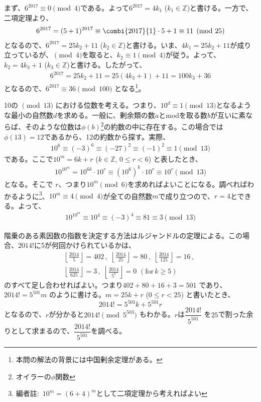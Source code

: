まず、$6^{2017}\equiv 0 \pmod{4}$である。よって$6^{2017}=4k_1$ ($k_1\in \mathbb{Z}$)と書ける。一方で、二項定理より、
\begin{align*}
 6^{2017}=(5+1)^{2017}\equiv \combi{2017}{1}\cdot 5 + 1 \equiv 11 \pmod{25}
\end{align*}
となるので、$6^{2017}=25k_2+11$ ($k_2\in \mathbb{Z}$)と書ける。いま、$4k_1=25k_2+11$が成り立っているが、$\pmod{4}$を取ると、$k_2\equiv 1 \pmod{4}$が従う。よって、$k_2=4k_3+1$ ($k_3\in \mathbb{Z}$)と書ける。したがって、
\begin{align*}
 6^{2017}=25k_2+11=25(4k_3+1)+11=100k_3+36
\end{align*}
となるので、$6^{2017}\equiv 36 \pmod{100}$ となる\footnote{本問の解法の背景には中国剰余定理がある。}。

10の $\pmod{13}$ における位数を考える。つまり、$10^d\equiv 1 \pmod{13}$となるような最小の自然数$d$を求める。一般に、剰余類の数$a$とmodを取る数$b$が互いに素ならば、そのような位数は$\phi (b)$\footnote{オイラーの$\phi$関数}の約数の中に存在する。この場合では$\phi(13)=12$であるから、12の約数から探す。実際、
\begin{align*}
 10^6\equiv (-3)^6\equiv (-27)^2\equiv (-1)^2\equiv 1 \pmod{13}
\end{align*}
である。ここで$10^m=6k+r$ ($k\in\mathbb{Z}$, $0\le r < 6$) と表したとき、
\begin{align*}
 10^{10^m}=10^{6k}\cdot 10^r\equiv (10^6)^k\cdot 10^r\equiv 10^r \pmod{13}
\end{align*}
となる。そこで $r$、つまり$10^m \pmod{6}$を求めればよいことになる。調べればわかるように\footnote{編者註:~$10^m=(6+4)^m$として二項定理から考えればよい}、$10^m\equiv 4 \pmod{4}$が全ての自然数$m$で成り立つので、$r=4$とできる。よって、
\begin{align*}
 10^{10^m}\equiv 10^4 \equiv (-3)^4\equiv 81\equiv 3 \pmod{13}
\end{align*}

階乗のある素因数の指数を決定する方法はルジャンドルの定理による。この場合、$2014!$に5が何回かけられているかは、
\begin{align*}
 \left\lfloor\frac{2014}{5}\right\rfloor=402 \,,\,\, \left\lfloor\frac{2014}{25}\right\rfloor=80 \,,\,\, \left\lfloor\frac{2014}{125}\right\rfloor=16 \,,\,\, \\
 \left\lfloor\frac{2014}{625}\right\rfloor=3 \,,\,\, \left\lfloor\frac{2014}{5^k}\right\rfloor=0 \,\,(\text{for}\,k\ge 5)
\end{align*}
のすべて足し合わせればよい。つまり$402+80+16+3=501$ であり、$2014!=5^{501}m$ のように書ける。$m=25k+r$ ($0\le r < 25$) と書いたとき、
\[ 2014!=5^{503}k+5^{501}r \]
となるので、$r$が分かると$2014! \pmod{5^{503}}$ もわかる。$r$は$\dfrac{2014!}{5^{501}}$ を$25$で割った余りとして求まるので、$\dfrac{2014!}{5^{501}}$を調べる。

